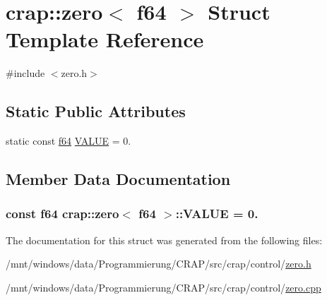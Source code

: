 \hypertarget{structcrap_1_1zero_3_01f64_01_4}{\section{crap\-:\-:zero$<$ f64 $>$ Struct Template Reference}
\label{structcrap_1_1zero_3_01f64_01_4}
}


{\ttfamily \#include $<$zero.\-h$>$}

\subsection*{Static Public Attributes}
\begin{DoxyCompactItemize}
\item 
static const \hyperlink{types_8h_a76c9f53497f766e57b184bc8a93ab73f}{f64} \hyperlink{structcrap_1_1zero_3_01f64_01_4_a6467fb22f2cf48e955ddde385f23fac2}{V\-A\-L\-U\-E} = 0.
\end{DoxyCompactItemize}


\subsection{Member Data Documentation}
\hypertarget{structcrap_1_1zero_3_01f64_01_4_a6467fb22f2cf48e955ddde385f23fac2}{
\subsubsection[{V\-A\-L\-U\-E}]{\setlength{\rightskip}{0pt plus 5cm}const {\bf f64} {\bf crap\-::zero}$<$ {\bf f64} $>$\-::V\-A\-L\-U\-E = 0.\hspace{0.3cm}{\ttfamily [static]}}}\label{structcrap_1_1zero_3_01f64_01_4_a6467fb22f2cf48e955ddde385f23fac2}


The documentation for this struct was generated from the following files\-:\begin{DoxyCompactItemize}
\item 
/mnt/windows/data/\-Programmierung/\-C\-R\-A\-P/src/crap/control/\hyperlink{zero_8h}{zero.\-h}\item 
/mnt/windows/data/\-Programmierung/\-C\-R\-A\-P/src/crap/control/\hyperlink{zero_8cpp}{zero.\-cpp}\end{DoxyCompactItemize}
